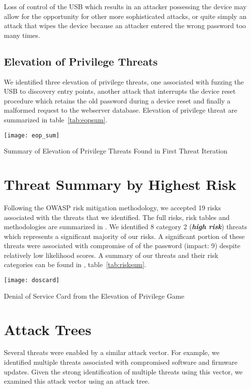 Loss of control of the USB which results in an attacker possessing the device
may allow for the opportunity for other more sophisticated attacks, or quite
simply an attack that wipes the device because an attacker entered the wrong
password too many times.





\subsection{Elevation of Privilege Threats}
We identified three elevation of privilege threats, one associated with fuzzing
the USB to discovery entry points, another attack that interrupts the device
reset procedure which retains the old password during a device reset and finally a malformed request to the webserver database.  Elevation
of privilege threat are summarized in table~\ref{tab:eopsum}.


\begin{table*}[ht]
    \centering
    \texttt{[image: eop\_sum]}
    \caption{Summary of Elevation of Privilege Threats Found in First Threat Iteration}
    \label{tab:eopsum}
\end{table*}



\section{Threat Summary by Highest Risk}
Following the OWASP risk mitigation methodology, we accepted 19 risks associated with the threats that we identified.  The full risks, risk tables and methodologies are
summarized in . We identified 8 category 2 (\emph{\textbf{high risk}})
threats which represents a significant majority of our risks.  A significant
portion of these threats were associated with compromise of of the password
(impact: 9) despite relatively low likelihood scores.  A summary of our threats
and their risk categories can be found in , table~\ref{tab:risksum}.

\begin{marginfigure}%
\centering
  \texttt{[image: doscard]}
  \caption{Denial of Service Card from the Elevation of Privilege Game}
  \label{fig:doscard}
\end{marginfigure}


\section{Attack Trees}
Several threats were enabled by a similar attack vector.  For example, we
identified multiple threats associated with compromised software and firmware
updates.  Given the strong identification of multiple threats using this vector,
we examined this attack vector using an attack tree.

